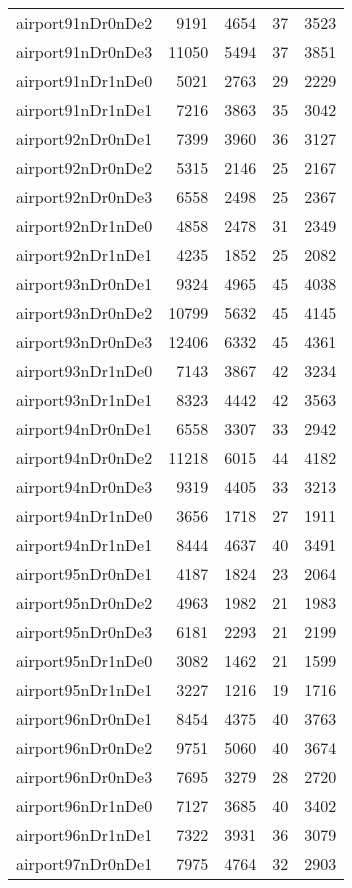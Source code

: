 \begin{longtable}{lrrrr}
airport91nDr0nDe2 & 9191 & 4654 & 37 & 3523 \\
airport91nDr0nDe3 & 11050 & 5494 & 37 & 3851 \\
airport91nDr1nDe0 & 5021 & 2763 & 29 & 2229 \\
airport91nDr1nDe1 & 7216 & 3863 & 35 & 3042 \\
airport92nDr0nDe1 & 7399 & 3960 & 36 & 3127 \\
airport92nDr0nDe2 & 5315 & 2146 & 25 & 2167 \\
airport92nDr0nDe3 & 6558 & 2498 & 25 & 2367 \\
airport92nDr1nDe0 & 4858 & 2478 & 31 & 2349 \\
airport92nDr1nDe1 & 4235 & 1852 & 25 & 2082 \\
airport93nDr0nDe1 & 9324 & 4965 & 45 & 4038 \\
airport93nDr0nDe2 & 10799 & 5632 & 45 & 4145 \\
airport93nDr0nDe3 & 12406 & 6332 & 45 & 4361 \\
airport93nDr1nDe0 & 7143 & 3867 & 42 & 3234 \\
airport93nDr1nDe1 & 8323 & 4442 & 42 & 3563 \\
airport94nDr0nDe1 & 6558 & 3307 & 33 & 2942 \\
airport94nDr0nDe2 & 11218 & 6015 & 44 & 4182 \\
airport94nDr0nDe3 & 9319 & 4405 & 33 & 3213 \\
airport94nDr1nDe0 & 3656 & 1718 & 27 & 1911 \\
airport94nDr1nDe1 & 8444 & 4637 & 40 & 3491 \\
airport95nDr0nDe1 & 4187 & 1824 & 23 & 2064 \\
airport95nDr0nDe2 & 4963 & 1982 & 21 & 1983 \\
airport95nDr0nDe3 & 6181 & 2293 & 21 & 2199 \\
airport95nDr1nDe0 & 3082 & 1462 & 21 & 1599 \\
airport95nDr1nDe1 & 3227 & 1216 & 19 & 1716 \\
airport96nDr0nDe1 & 8454 & 4375 & 40 & 3763 \\
airport96nDr0nDe2 & 9751 & 5060 & 40 & 3674 \\
airport96nDr0nDe3 & 7695 & 3279 & 28 & 2720 \\
airport96nDr1nDe0 & 7127 & 3685 & 40 & 3402 \\
airport96nDr1nDe1 & 7322 & 3931 & 36 & 3079 \\
airport97nDr0nDe1 & 7975 & 4764 & 32 & 2903 \\

\end{longtable}
